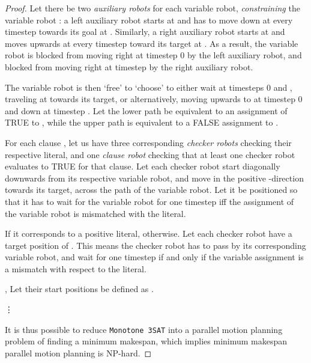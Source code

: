 \begin{proof}
	Let there be two \emph{auxiliary robots} for each variable robot, \emph{constraining} the variable robot : a left auxiliary robot starts at  and has to move down at every timestep towards its goal at . Similarly, a right auxiliary robot starts at  and moves upwards at every timestep toward its target at . As a result, the variable robot  is blocked from moving right at timestep 0 by the left auxiliary robot, and blocked from moving right at timestep  by the right auxiliary robot.

	The variable robot is then `free' to `choose' to either wait at timesteps 0 and , traveling at  towards its target, or alternatively, moving upwards to  at timestep 0 and down at timestep . Let the lower path be equivalent to an assignment of TRUE to , while the upper path is equivalent to a FALSE assignment to .

	For each clause , let us have three corresponding \emph{checker robots}  checking their respective literal, and one \emph{clause robot} checking that at least one checker robot evaluates to TRUE for that clause. Let each checker robot start diagonally downwards from its respective variable robot, and move in the positive -direction towards its target, across the path of the variable robot. Let it be positioned so that it has to wait for the variable robot for one timestep iff the assignment of the variable robot is mismatched with the literal. 




	If it corresponds to a positive literal,  otherwise. Let each checker robot have a target position of . This means the checker robot has to pass by its corresponding variable robot, and wait for one timestep if and only if the variable assignment is a mismatch with respect to the literal. 

	,  Let their start positions be defined as .







	\vdots 

	It is thus possible to reduce \texttt{Monotone 3SAT} into a parallel motion planning problem of finding a minimum makespan, which implies minimum makespan parallel motion planning is NP-hard.
 
\end{proof}

